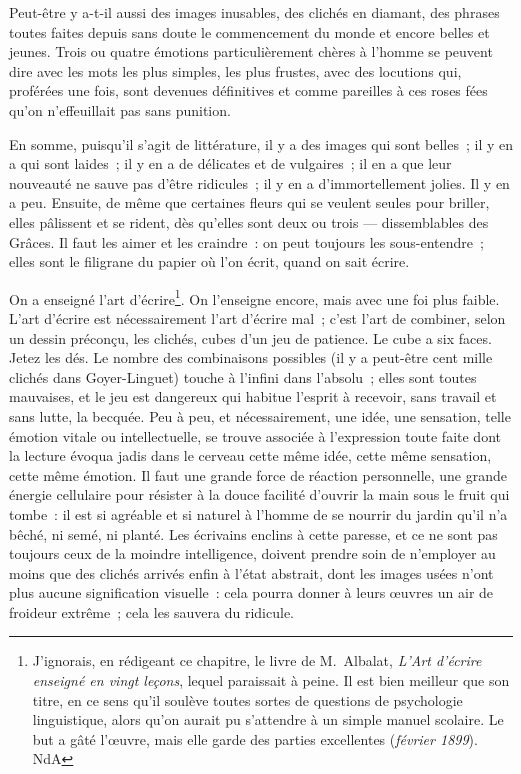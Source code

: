 \documentclass[french,twoside]{book} %
\begin{document}
Peut-être y a-t-il aussi des images inusables, des clichés en diamant, des phrases toutes faites depuis sans doute le commencement du monde et encore belles et jeunes. Trois ou quatre émotions particulièrement chères à l’homme se peuvent dire avec les mots les plus simples, les plus frustes, avec des locutions qui, proférées une fois, sont devenues définitives et comme pareilles à ces roses fées qu’on n’effeuillait pas sans punition.\par
En somme, puisqu’il s’agit de littérature, il y a des images qui sont belles ; il y en a qui sont laides ; il y en a de délicates et de vulgaires ; il en a que leur nouveauté ne sauve pas d’être ridicules ; il y en a d’immortellement jolies. Il y en a peu. Ensuite, de même que certaines fleurs qui se veulent seules pour briller, elles pâlissent et se rident, dès qu’elles sont deux ou trois — dissemblables des Grâces. Il faut les aimer et les craindre : on peut toujours les sous-entendre ; elles sont le filigrane du papier où l’on écrit, quand on sait écrire.\par
On a enseigné l’art d’écrire\footnote{J’ignorais, en rédigeant ce chapitre, le livre de M. Albalat, {\itshape L’Art d’écrire enseigné en vingt leçons}, lequel paraissait à peine. Il est bien meilleur que son titre, en ce sens qu’il soulève toutes sortes de questions de psychologie linguistique, alors qu’on aurait pu s’attendre à un simple manuel scolaire. Le but a gâté l’œuvre, mais elle garde des parties excellentes ({\itshape février 1899}). NdA}. On l’enseigne encore, mais avec une foi plus faible. L’art d’écrire est nécessairement l’art d’écrire mal ; c’est l’art de combiner, selon un dessin préconçu, les clichés, cubes d’un jeu de patience. Le cube a six faces. Jetez les dés. Le nombre des combinaisons possibles (il y a peut-être cent mille clichés dans Goyer-Linguet) touche à l’infini dans l’absolu ; elles sont toutes mauvaises, et le jeu est dangereux qui habitue l’esprit à recevoir, sans travail et sans lutte, la becquée. Peu à peu, et nécessairement, une idée, une sensation, telle émotion vitale ou intellectuelle, se trouve associée à l’expression toute faite dont la lecture évoqua jadis dans le cerveau cette même idée, cette même sensation, cette même émotion. Il faut une grande force de réaction personnelle, une grande énergie cellulaire pour résister à la douce facilité d’ouvrir la main sous le fruit qui tombe : il est si agréable et si naturel à l’homme de se nourrir du jardin qu’il n’a bêché, ni semé, ni planté. Les écrivains enclins à cette paresse, et ce ne sont pas toujours ceux de la moindre intelligence, doivent prendre soin de n’employer au moins que des clichés arrivés enfin à l’état abstrait, dont les images usées n’ont plus aucune signification visuelle : cela pourra donner à leurs œuvres un air de froideur extrême ; cela les sauvera du ridicule.\par
\end{document}
